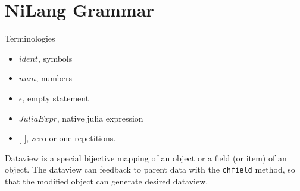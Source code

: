 \documentclass[aps,twocolumn,longbibliography,english,superscriptaddress,prr]{revtex4-1}
\newcommand{\<}{\langle}
\renewcommand{\>}{\rangle}
\theoremstyle{definition}\newtheorem{definition}{\textit{Definition}}
\begin{document}
\pagebreak
\appendix

\section{NiLang Grammar}\label{app:grammar}

Terminologies
\begin{itemize}
    \item $ident$, symbols
    \item $num$, numbers
    \item $\epsilon$, empty statement
    \item $JuliaExpr$, native julia expression
    \item $[$ $]$,  zero or one repetitions.
\end{itemize}

\begin{minipage}{0.3\textwidth}
    \small

\end{minipage}

Dataview is a special bijective mapping of an object or a field (or item) of an object.
The dataview can feedback to parent data with the 
\texttt{chfield} method, so that the modified object can generate desired dataview.
\end{document}
